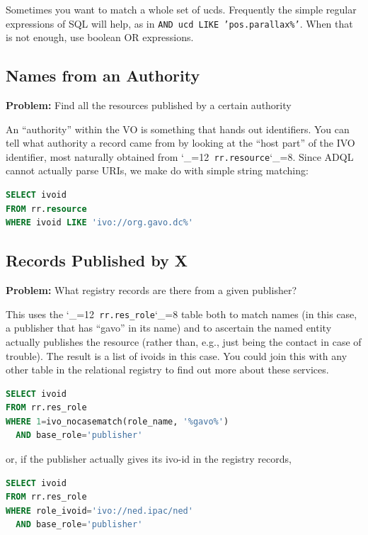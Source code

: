 \documentclass[11pt,a4paper]{ivoa}
\makeatletter
\def\rtent#1{\texttt{\color{rtcolor}\verb|#1|}}
\def\makeunderscoreletter{\catcode`\_=12}
\def\makeunderscoresubscript{\catcode`\_=8}
\def\rtent{\makeunderscoreletter\relax\rt@nt}
\def\rt@nt#1{\texttt{\color{rtcolor} #1}\makeunderscoresubscript{}}
\makeatother
\begin{document}
Sometimes you want to match a whole set of ucds.  Frequently the
simple regular expressions of SQL will help, as in
\texttt{AND ucd LIKE 'pos.parallax\%'}.  When that is not enough,
use boolean OR expressions.

\subsection{Names from an Authority}

\textbf{Problem:} Find all the resources published by a certain
authority

An ``authority'' within the VO is something that hands out identifiers.
You can tell what authority a record came from by looking at the ``host
part'' of the IVO identifier, most naturally obtained from
\rtent{rr.resource}.  Since ADQL cannot actually parse
URIs, we make do with simple string matching:


\begin{lstlisting}[language=SQL,flexiblecolumns=true]
SELECT ivoid
FROM rr.resource
WHERE ivoid LIKE 'ivo://org.gavo.dc%'
\end{lstlisting}

\subsection{Records Published by X}

\textbf{Problem:} What registry records are there from a given
publisher?

This uses the
\rtent{rr.res_role}
 table both to
match names (in this case, a publisher that has ``gavo'' in its name) and
to ascertain the named entity actually publishes the resource (rather
than, e.g., just being the contact in case of trouble).  The result is a
list of ivoids in this case.  You could join this with any other
table in the relational registry to find out more about these
services.


\begin{lstlisting}[language=SQL,flexiblecolumns=true]
SELECT ivoid
FROM rr.res_role
WHERE 1=ivo_nocasematch(role_name, '%gavo%')
  AND base_role='publisher'
\end{lstlisting}

or, if the publisher actually gives its ivo-id in the registry
records,


\begin{lstlisting}[language=SQL,flexiblecolumns=true]
SELECT ivoid
FROM rr.res_role
WHERE role_ivoid='ivo://ned.ipac/ned'
  AND base_role='publisher'
\end{lstlisting}
\end{document}
